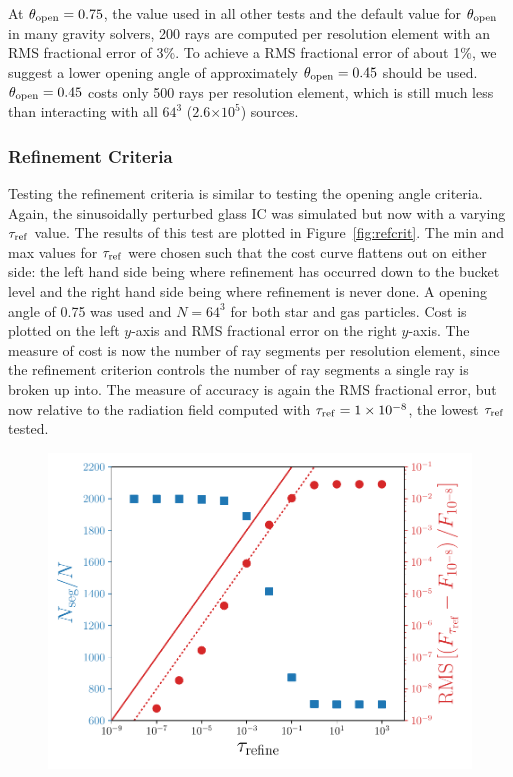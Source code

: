 \documentclass[fleq,usenatbib]{mnras}
\providecommand{\e}[1]{\ensuremath{\times10^{#1}}}
\newcommand{\tr}{\tau_{\rm ref}}
\newcommand{\tO}{\theta_{\rm open}}
\begin{document}
{At $\tO=0.75$, the value used in all other tests and the 
default value for $\tO$ in many gravity solvers, 200 rays are 
computed per resolution element with an RMS fractional error of 3\%. To 
achieve a RMS fractional error of about 1\%, we suggest a lower opening angle 
of approximately $\tO=0.45$ should be used. $\tO=0.45$ costs only 500 rays per 
resolution element, which is still much less than interacting with all $64^3$ 
($2.6\e{5}$) sources.

\subsubsection{Refinement Criteria}
Testing the refinement criteria is similar to testing the opening angle 
criteria. Again, the sinusoidally perturbed glass IC was simulated but now 
with a varying $\tr$ value. The results of this test are plotted in 
Figure~\ref{fig:refcrit}. The min and max values for $\tr$ were chosen such 
that the cost curve flattens out on either side: the left hand side being 
where refinement has occurred down to the bucket level and the right hand side 
being where refinement is never done. A opening angle of 0.75 was used and 
$N=64^3$ for both star and gas particles. Cost is plotted on the left $y$-axis 
and RMS fractional error on the right $y$-axis. The measure of cost is now 
the number of ray segments per resolution element, since the refinement 
criterion controls the number of ray segments a single ray is broken up into. 
The measure of accuracy is again the RMS fractional error, but now relative to 
the radiation field computed with $\tr=1\e{-8}$, the lowest $\tr$ tested.
\begin{figure}
\includegraphics[width=1\linewidth]{Figures/refinement_criteria.pdf}

\end{figure}}
\end{document}

